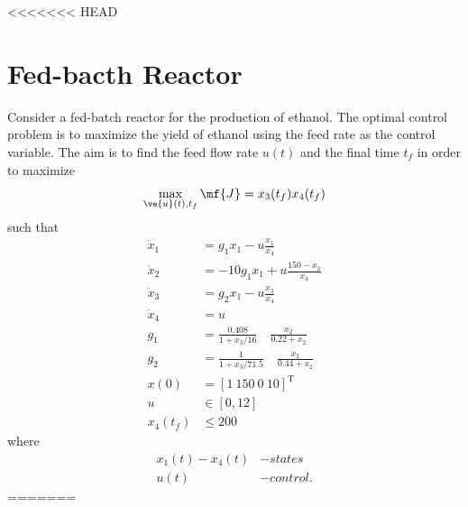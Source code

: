 <<<<<<< HEAD
\section{Fed-bacth Reactor}
Consider a fed-batch reactor for the production of ethanol. The optimal control problem is to maximize the yield of ethanol using the feed rate as the control variable. The aim is to find the feed flow rate $u(t)$ and the final time $t_f$ in order to maximize
\begin{equation}
\max_{\ve{u}(t), t_f} \mf{J} = x_{3}(t_{f})x_{4}(t_{f}) 
\end{equation}
such that
\begin{align*}
\dot{x}_1 &= g_1x_1 - u\frac{x_1}{x_4}\\
\dot{x}_2 &= -10g_1x_1 + u\frac{150-x_2}{x_4}\\
\dot{x}_3 &= g_2x_1 - u\frac{x_3}{x_4}\\
\dot{x}_4 &= u\\
g_1       &= \frac{0.408}{1+x_3/16} \quad \frac{x_2}{0.22+x_2}\\
g_2		  &= \frac{1}{1+x_3/71.5} \quad \frac{x_2}{0.44+x_2}\\
x(0)	  &= [1~150~0~10]^{\textrm{T}}\\
u &\in [0,12]\\
x_4(t_f) &\leq 200
\end{align*}
where
\begin{align*}
x_{1}(t) - x_{4}(t) &- states\\
u(t) &- control.
\end{align*}
=======
